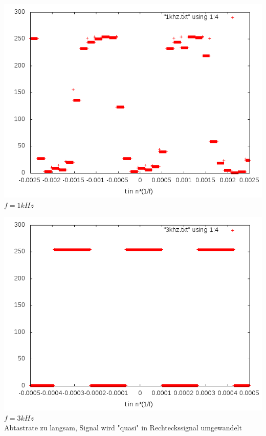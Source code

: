 \documentclass[compress,11pt]{beamer}
\begin{document}
\begin{frame}
\includegraphics[width=.7\textwidth]{../3/1khz}\\
$f = 1 kHz$
\end{frame}
\begin{frame}

\includegraphics[width=.7\textwidth]{../3/3khz}\\
$f = 3 kHz$\\
Abtastrate zu langsam, Signal wird "quasi" in Rechteckssignal umgewandelt
\end{frame}
\end{document}
